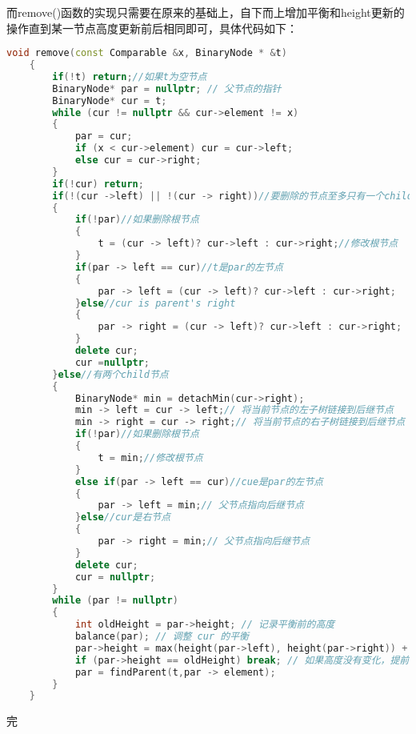 \documentclass[fontset=fandol]{ctexart}
\begin{document}
而remove()函数的实现只需要在原来的基础上，自下而上增加平衡和height更新的操作直到某一节点高度更新前后相同即可，具体代码如下：
\begin{lstlisting}[language=C++, caption={remove函数}]  
    void remove(const Comparable &x, BinaryNode * &t) 
    {
        if(!t) return;//如果t为空节点
        BinaryNode* par = nullptr; // 父节点的指针
        BinaryNode* cur = t;
        while (cur != nullptr && cur->element != x) 
        {
            par = cur;
            if (x < cur->element) cur = cur->left;
            else cur = cur->right;
        }
        if(!cur) return;
        if(!(cur ->left) || !(cur -> right))//要删除的节点至多只有一个child节点
        {
            if(!par)//如果删除根节点
            {
                t = (cur -> left)? cur->left : cur->right;//修改根节点
            }
            if(par -> left == cur)//t是par的左节点
            {
                par -> left = (cur -> left)? cur->left : cur->right;
            }else//cur is parent's right
            {
                par -> right = (cur -> left)? cur->left : cur->right;
            }
            delete cur;
            cur =nullptr;
        }else//有两个child节点
        {
            BinaryNode* min = detachMin(cur->right);
            min -> left = cur -> left;// 将当前节点的左子树链接到后继节点
            min -> right = cur -> right;// 将当前节点的右子树链接到后继节点
            if(!par)//如果删除根节点
            {
                t = min;//修改根节点
            }
            else if(par -> left == cur)//cue是par的左节点
            {
                par -> left = min;// 父节点指向后继节点
            }else//cur是右节点
            {
                par -> right = min;// 父节点指向后继节点
            }
            delete cur;
            cur = nullptr;
        }
        while (par != nullptr) 
        {
            int oldHeight = par->height; // 记录平衡前的高度
            balance(par); // 调整 cur 的平衡
            par->height = max(height(par->left), height(par->right)) + 1; // 更新 cur 的高度
            if (par->height == oldHeight) break; // 如果高度没有变化，提前停止
            par = findParent(t,par -> element);
        }
    }
\end{lstlisting}
完
\end{document}
